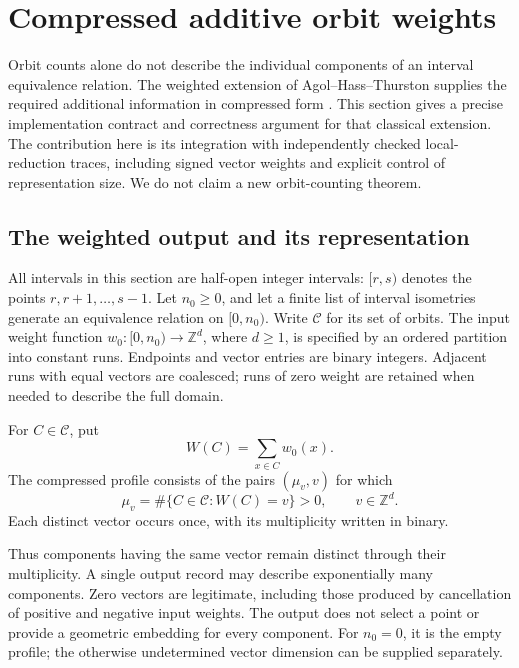 \section{Compressed additive orbit weights}
\label{sec:weighted-replay}

Orbit counts alone do not describe the individual components of an interval
equivalence relation.  The weighted extension of Agol--Hass--Thurston supplies
the required additional information in compressed form
\cite{AHT2006}.  This section gives a precise implementation contract and
correctness argument for that classical extension.  The contribution here is
its integration with independently checked local-reduction traces, including
signed vector weights and explicit control of representation size.  We do not
claim a new orbit-counting theorem.

\subsection{The weighted output and its representation}
\label{sec:weighted-contract}

All intervals in this section are half-open integer intervals: $[r,s)$ denotes
the points $r,r+1,\ldots,s-1$.  Let $n_0\geq 0$, and let a finite list of
interval isometries generate an equivalence relation on $[0,n_0)$.  Write
$\mathcal C$ for its set of orbits.  The input weight function
$w_0:[0,n_0)\to\mathbb Z^d$, where $d\geq1$, is specified by an ordered
partition into constant runs.  Endpoints and vector entries are binary
integers.  Adjacent runs with equal vectors are coalesced; runs of zero weight
are retained when needed to describe the full domain.

\begin{definition}
\label{def:weighted-profile}
For $C\in\mathcal C$, put
\[
 W(C)=\sum_{x\in C}w_0(x).
\]
The compressed profile consists of the pairs $(\mu_v,v)$ for which
\[
 \mu_v=\#\{C\in\mathcal C:W(C)=v\}>0,
 \qquad v\in\mathbb Z^d.
\]
Each distinct vector occurs once, with its multiplicity written in binary.
\end{definition}

Thus components having the same vector remain distinct through their
multiplicity.  A single output record may describe exponentially many
components.  Zero vectors are legitimate, including those produced by
cancellation of positive and negative input weights.  The output does not
select a point or provide a geometric embedding for every component.  For
$n_0=0$, it is the empty profile; the otherwise undetermined vector dimension
can be supplied separately.

